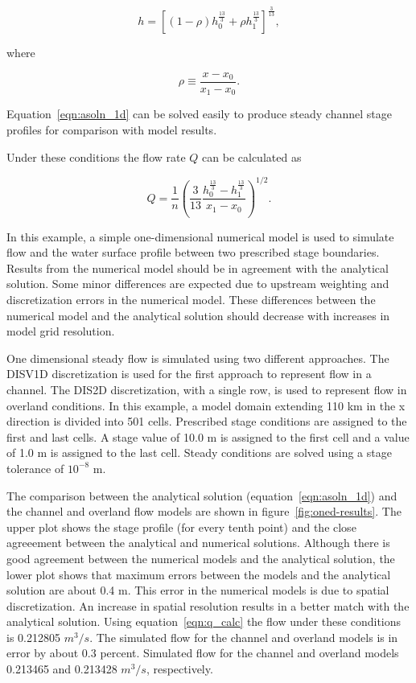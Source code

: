 \documentclass[fleqn]{article}
\begin{document}
\begin{equation}
  h = \left [ \left (1 - \rho \right ) h^{\frac{13}{3}}_{0} + \rho h^{\frac{13}{3}}_{1} \right ]^{\frac{3}{13}} ,
  \label{eqn:asoln_1d}
\end{equation}

\noindent where

\begin{equation}
  \rho \equiv \frac{x - x_0}{x_1 - x_0} .
  \label{eqn:rho_defined_x}
\end{equation}

\noindent Equation~\ref{eqn:asoln_1d} can be solved easily to produce steady channel stage profiles for comparison with model results.

Under these conditions the flow rate $Q$ can be calculated as

\begin{equation}
  Q = \frac{1}{n} \left ( 
    \frac{3}{13}
    \frac{h^{\frac{13}{3}}_{0} - h^{\frac{13}{3}}_{1}}{x_1 - x_0}
  \right )^{1/2}.
  \label{eqn:q_calc}
\end{equation}


In this example, a simple one-dimensional numerical model is used to simulate flow and the water surface profile between two prescribed stage boundaries.  Results from the numerical model should be in agreement with the analytical solution.  Some minor differences are expected due to upstream weighting and discretization errors in the numerical model.  These differences between the numerical model and the analytical solution should decrease with increases in model grid resolution.

One dimensional steady flow is simulated using two different approaches.  The DISV1D discretization is used for the first approach to represent flow in a channel.  The DIS2D discretization, with a single row, is used to represent flow in overland conditions.  In this example, a model domain extending 110 km in the x direction is divided into 501 cells.  Prescribed stage conditions are assigned to the first and last cells.  A stage value of 10.0 m is assigned to the first cell and a value of 1.0 m is assigned to the last cell.  Steady conditions are solved using a stage tolerance of $10^{-8}$ m.

The comparison between the analytical solution (equation~\ref{eqn:asoln_1d}) and the channel and overland flow models are shown in figure~\ref{fig:oned-results}.  The upper plot shows the stage profile (for every tenth point) and the close agreeement between the analytical and numerical solutions.  Although there is good agreement between the numerical models and the analytical solution, the lower plot shows that maximum errors between the models and the analytical solution are about 0.4 m.  This error in the numerical models is due to spatial discretization.  An increase in spatial resolution results in a better match with the analytical solution.  Using equation~\ref{eqn:q_calc} the flow under these conditions is 0.212805 $m^3/s$.  The simulated flow for the channel and overland models is in error by about 0.3 percent. Simulated flow for the channel and overland models 0.213465 and 0.213428 $m^3/s$, respectively.  
\end{document}
